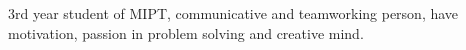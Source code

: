 

\begin{cvparagraph}

3rd year student of MIPT, communicative and teamworking person, have motivation,
 passion in problem solving and creative mind.
\end{cvparagraph}
